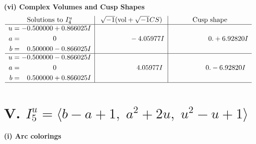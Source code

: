 \documentclass[1p]{elsarticle_modified}
\theoremstyle{definition}
\newcommand{\I}{\sqrt{-1}}
\begin{document}
\newpage\flushleft \textbf{(vi) Complex Volumes and Cusp Shapes}
$$\begin{array}{c|c|c}  
\text{Solutions to }I^u_{4}& \I (\text{vol} + \sqrt{-1}CS) & \text{Cusp shape}\\
 \hline 
\begin{aligned}
u &= -0.500000 + 0.866025 I \\
a &= \phantom{-0.000000 } 0 \\
b &= \phantom{-}0.500000 - 0.866025 I\end{aligned}
 & \phantom{-0.000000 } -4.05977 I & \phantom{-0.000000 -}0. + 6.92820 I \\ \hline\begin{aligned}
u &= -0.500000 - 0.866025 I \\
a &= \phantom{-0.000000 } 0 \\
b &= \phantom{-}0.500000 + 0.866025 I\end{aligned}
 & \phantom{-0.000000 -}4.05977 I & \phantom{-0.000000 } 0. - 6.92820 I\\
 \hline 
 \end{array}$$\newpage\newpage\renewcommand{\arraystretch}{1}
\centering \section*{V. $I^u_{5}= \langle b- a+1,\;a^2+2 u,\;u^2- u+1 \rangle$}
\flushleft \textbf{(i) Arc colorings}\\
\end{document}

